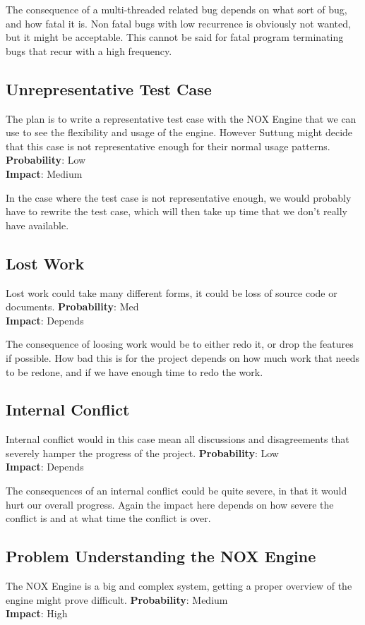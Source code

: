 The consequence of a multi-threaded related bug depends on what sort of bug, 
and how fatal it is. Non fatal bugs with low recurrence is obviously not wanted,
but it might be acceptable. This cannot be said for fatal program terminating bugs
that recur with a high frequency.

\subsection*{Unrepresentative Test Case}
The plan is to write a representative test case with the NOX Engine that we can use
to see the flexibility and usage of the engine. However Suttung might decide that this
case is not representative enough for their normal usage patterns.
\textbf{Probability}: Low\\
\textbf{Impact}: Medium

In the case where the test case is not representative enough, we would probably have to
rewrite the test case, which will then take up time that we don't really have available.

\subsection*{Lost Work}
Lost work could take many different forms, it could be loss of source code or documents.
\textbf{Probability}: Med\\
\textbf{Impact}: Depends

The consequence of loosing work would be to either redo it, or drop the features if possible.
How bad this is for the project depends on how much work that needs to be redone, and
if we have enough time to redo the work.

\subsection*{Internal Conflict}
Internal conflict would in this case mean all discussions and disagreements that severely
hamper the progress of the project.
\textbf{Probability}: Low\\
\textbf{Impact}: Depends

The consequences of an internal conflict could be quite severe, in that it would hurt
our overall progress. Again the impact here depends on how severe the conflict is
and at what time the conflict is over.

\subsection*{Problem Understanding the NOX Engine}
The NOX Engine is a big and complex system, getting a proper overview of the engine
might prove difficult.
\textbf{Probability}: Medium\\
\textbf{Impact}: High

